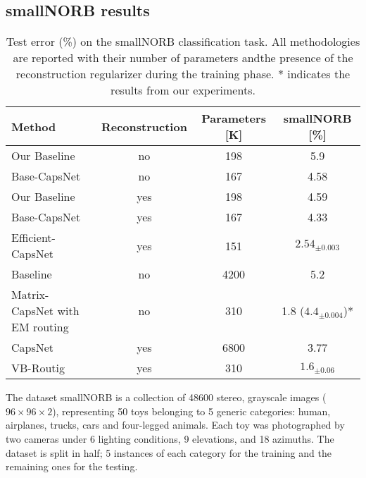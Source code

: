 \documentclass{article}
\begin{document}
\subsection{smallNORB results}
\begin{table}[h]
\centering
\begin{tabular}{lccc}
\toprule
Method                         & Reconstruction & Parameters {[}K{]} & smallNORB {[}\%{]} \\ \hline
Our Baseline                   & no             & 198                & 5.9            \\ 
Base-CapsNet                   & no             & 167                & 4.58           \\ 
Our Baseline                   & yes            & 198                & 4.59           \\ 
Base-CapsNet                   & yes            & 167                & 4.33           \\ 
Efficient-CapsNet              & yes            & 151                & $2.54_{\pm 0.003}$  \\ \hline
Baseline \cite{hinton2018matrix}                      & no             & 4200               & 5.2            \\ 
Matrix-CapsNet with EM routing \cite{hinton2018matrix} & no             & 310                & 1.8 ($4.4_{\pm 0.004}$)*          \\ 
CapsNet \cite{sabour2017dynamic}                        & yes            & 6800               & 3.77           \\ 
VB-Routig \cite{ribeiro2020capsule}                      & yes            & 310                & $1.6_{\pm 0.06}$    \\ \bottomrule
\end{tabular}
\caption{Test error (\%) on the smallNORB classification task. All methodologies are reported with their number of parameters andthe presence of the reconstruction regularizer during the training phase. * indicates the results from our experiments.}
\label{tab:results_smallnorb}
\end{table}
The dataset smallNORB is a collection of 48600 stereo, grayscale images ($96 \times 96 \times 2$), representing 50 toys belonging to 5 generic categories: human, airplanes, trucks, cars and four-legged animals. Each toy was photographed by two cameras under 6 lighting conditions, 9 elevations, and 18 azimuths. The dataset is split in half; 5 instances of each category for the training and the remaining ones for the testing.
\end{document}
